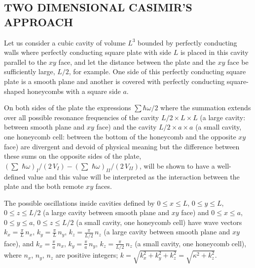 \documentclass[twoside, 10pt, ptm]{article}
\def\myvspacebeforesubsection{-2.0mm}
\def\myvspaceaftersubsection{-2.5mm}
\begin{document}
\begin{multicols}{2}
\vspace{\myvspacebeforesubsection}
    \subsection*{\centering\uppercase{Two dimensional Casimir's
approach}}\label{two-dimensional-casimirs-approach}
\vspace{\myvspaceaftersubsection}


    Let us consider a cubic cavity of volume \(L^3\) bounded by perfectly
conducting walls where perfectly conducting square plate with side
\(L\) is placed in this cavity parallel to the \(xy\) face, and let
the distance between the plate and the \(xy\) face be sufficiently large,
\(L/2\), for example.
One side of this perfectly conducting square plate is a smooth plane and
another is covered with perfectly conducting square-shaped honeycombs with
a square side \(a\).

On both sides of the plate the expressions \(\sum\hbar\omega\big/2\)
where the summation extends over all possible resonance frequencies of
the cavity \(L/2 \times L \times L\) (a large cavity: between smooth plane
and \(xy\) face) and the cavity \(L/2 \times a\times a\) (a small
cavity, one honeycomb cell: between the bottom of the honeycomb and the
opposite \(xy\) face) are divergent and devoid of physical meaning but
the difference between these sums on the opposite sides of the plate,
\(\left(\sum\,\,\hbar\omega\right)_{I}\big/{\left(2\,V_{I}\right)} - \left(\sum\,\,\hbar\omega\right)_{II}\big/{\left(2\,V_{II}\right)}\),
will be shown to have a well-defined value and this value will be
interpreted as the interaction between the plate and the both remote
\(xy\) faces.

    The possible oscillations inside cavities defined by
\(0 \leq x \leq L\), \(0 \leq y \leq L\), \(0 \leq z \leq L/2\) (a large cavity between smooth
plane and \(xy\) face) and
\(0 \leq x \leq a\), \(0 \leq y \leq a\), \(0 \leq z \leq L/2\) (a small cavity, one honeycomb
cell) have wave vectors
\(k_x = \frac{\pi}{L}\,n_x\), \(k_y = \frac{\pi}{L}\,n_y\),
\(k_z = \frac{\pi}{L/2}\,n_z\) (a large cavity between smooth plane and
\(xy\) face), and
\(k_x = \frac{\pi}{a}\,n_x\), \(k_y = \frac{\pi}{a}\,n_y\),
\(k_z = \frac{\pi}{L/2}\,n_z\) (a small cavity, one honeycomb cell),
where \(n_x\), \(n_y\), \(n_z\) are positive integers;
    \(k = \sqrt{k_x^2+k_y^2+k_z^2} = \sqrt{\kappa^2+k_z^2}\).


\end{multicols}
\end{document}
